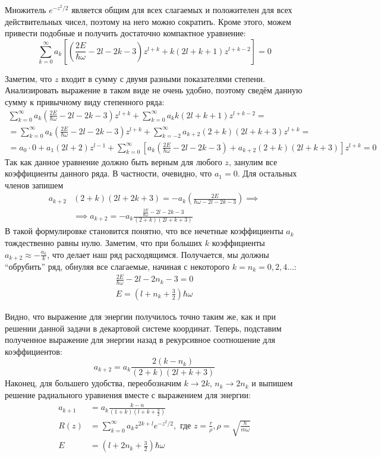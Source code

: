 Множитель $e^{-z^2/2}$ является общим для всех слагаемых и положителен для всех действительных чисел, поэтому на него можно сократить. Кроме этого, можем привести подобные и получить достаточно компактное уравнение:
\[
\sum_{k=0}^\infty a_k \left[\left(\frac{2E}{\hbar\omega} - 2l - 2k - 3\right)z^{l+k} + k(2l+k+1) z^{l+k-2}\right] = 0
\]

Заметим, что $z$ входит в сумму с двумя разными показателями степени. Анализировать выражение в таком виде не очень удобно, поэтому сведём данную сумму к привычному виду степенного ряда:
\begin{gather*}
    \sum_{k=0}^\infty a_k\left(\frac{2E}{\hbar\omega} - 2l - 2k -3\right)z^{l+k} + \sum_{k=0}^\infty a_k k(2l+k+1)z^{l+k-2} = \\
    = \sum_{k=0}^\infty a_k\left(\frac{2E}{\hbar\omega} - 2l - 2k -3\right)z^{l+k} + \sum_{k=-2}^\infty a_{k+2}(2+k)(2l+k+3)z^{l+k} = \\
    = a_0\cdot0 + a_1(2l+2)z^{l-1} + \sum_{k=0}^\infty \left[a_k\left(\frac{2E}{\hbar\omega} - 2l - 2k - 3\right) + a_{k+2}(2+k)(2l+k+3)\right]z^{l+k} = 0
\end{gather*}
Так как данное уравнение должно быть верным для любого $z$, занулим все коэффициенты данного ряда. В частности, очевидно, что $a_1 = 0$. Для остальных членов запишем
\begin{align*}
    a_{k+2}&(2+k)(2l+2k+3) = -a_k\left(\frac{2E}{\hbar\omega-2l-2k-3}\right) \implies \\
    &\implies a_{k+2} = -a_k\frac{\frac{2E}{\hbar\omega}-2l-2k-3}{(2+k)(2l+k+3)}
\end{align*}
В такой формулировке становится понятно, что все нечетные коэффициенты $a_k$ тождественно равны нулю. Заметим, что при больших $k$ коэффициенты $a_{k+2} \approx -\frac{a_k}{k}$, что делает наш ряд расходящимся. Получается, мы должны ``обрубить'' ряд, обнуляя все слагаемые, начиная с некоторого $k = n_k = 0, 2, 4 \dots$:
\begin{gather*}
    \frac{2E}{\hbar\omega}-2l-2n_k-3 = 0\\
    E = \left(l+n_k+\frac{3}{2}\right)\hbar\omega
\end{gather*}

Видно, что выражение для энергии получилось точно таким же, как и при решении данной задачи в декартовой системе координат. Теперь, подставим полученное выражение для энергии назад в рекурсивное соотношение для коэффициентов:
\[
a_{k+2} = a_k\frac{2(k-n_k)}{(2+k)(2l+k+3)}
\]
Наконец, для большего удобства, переобозначим $k\rightarrow2k$, $n_k\rightarrow2n_k$ и выпишем решение радиального уравнения вместе с выражением для энергии:
\begin{align*}
    a_{k+1} &= a_k\frac{k-n}{\left(1+k\right)\left(l+k+\frac{3}{2}\right)} \\
    R(z) &= \sum_{k=0}^\infty a_k z^{2k+l} e^{-z^2/2}, \text{ где } z = \frac{r}{\rho}, \rho = \sqrt{\frac{\hbar}{m\omega}} \\
    E &= \left(l+2n_k+\frac{3}{2}\right)\hbar\omega
\end{align*}

